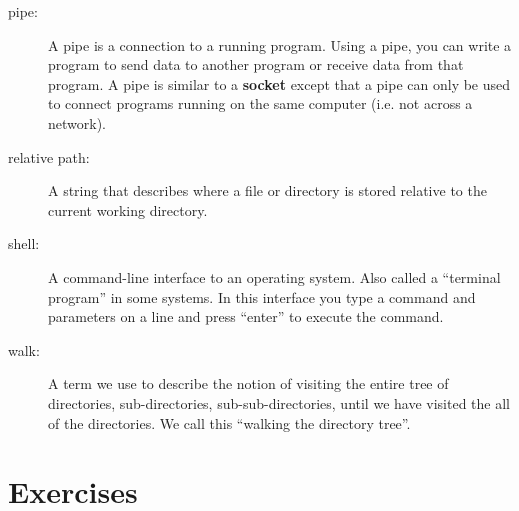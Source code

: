 \documentclass[11pt]{book}
\begin{document}
\begin{description}
\item[pipe:] A pipe is a connection to a running program.  Using
a pipe, you can write a program to send data to another program
or receive data from that program.  A pipe is similar to a 
{\bf socket} except that a pipe can only be used to 
connect programs running on the same computer (i.e. not
across a network).

\item[relative path:] A string that describes where a file or
directory is stored relative to the current working 
directory.

\item[shell:] A command-line interface to an operating system.
Also called a ``terminal program'' in some systems. In this interface
you type a command and parameters on a line and press ``enter''
to execute the command.

\item[walk:] A term we use to describe the notion of visiting
the entire tree of directories, sub-directories, sub-sub-directories, 
until we have visited the all of the directories.  We call this
``walking the directory tree''.

\end{description}


\section{Exercises}
\end{document}
